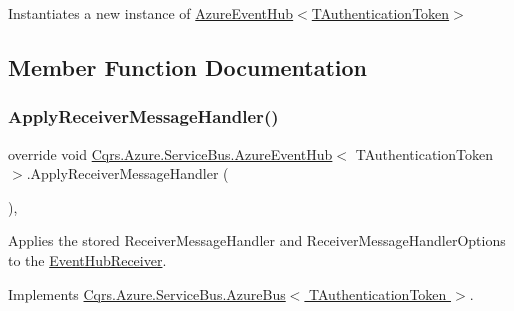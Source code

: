 Instantiates a new instance of \hyperlink{classCqrs_1_1Azure_1_1ServiceBus_1_1AzureEventHub_adef2c26639ae4a7725c397da7fd90000_adef2c26639ae4a7725c397da7fd90000}{Azure\+Event\+Hub$<$\+T\+Authentication\+Token$>$} 



\subsection{Member Function Documentation}
\mbox{\label{classCqrs_1_1Azure_1_1ServiceBus_1_1AzureEventHub_af2efc497815828b6fe0b4d6621bc8b41_af2efc497815828b6fe0b4d6621bc8b41}} 
\subsubsection{\texorpdfstring{Apply\+Receiver\+Message\+Handler()}{ApplyReceiverMessageHandler()}}
{\footnotesize\ttfamily override void \hyperlink{classCqrs_1_1Azure_1_1ServiceBus_1_1AzureEventHub}{Cqrs.\+Azure.\+Service\+Bus.\+Azure\+Event\+Hub}$<$ T\+Authentication\+Token $>$.Apply\+Receiver\+Message\+Handler (\begin{DoxyParamCaption}{ }\end{DoxyParamCaption})\hspace{0.3cm}{\ttfamily [protected]}, {\ttfamily [virtual]}}



Applies the stored Receiver\+Message\+Handler and Receiver\+Message\+Handler\+Options to the \hyperlink{classCqrs_1_1Azure_1_1ServiceBus_1_1AzureEventHub_a1b12b47dbb9b9afe2014477a2e457c35_a1b12b47dbb9b9afe2014477a2e457c35}{Event\+Hub\+Receiver}. 



Implements \hyperlink{classCqrs_1_1Azure_1_1ServiceBus_1_1AzureBus_aad25a164e9e526c59d8ef98635c98095_aad25a164e9e526c59d8ef98635c98095}{Cqrs.\+Azure.\+Service\+Bus.\+Azure\+Bus$<$ T\+Authentication\+Token $>$}.

\mbox{\label{classCqrs_1_1Azure_1_1ServiceBus_1_1AzureEventHub_ac62e15208566056ffad05f46a303de8f_ac62e15208566056ffad05f46a303de8f}} 
